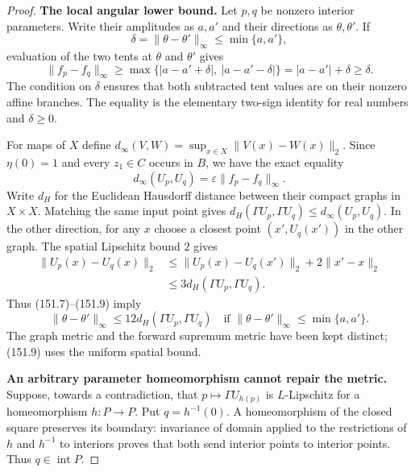 \begin{proof}
\textbf{The local angular lower bound.}
Let $p,q$ be nonzero interior parameters. Write their amplitudes as
$a,a'$ and their directions as $\theta,\theta'$. If
\[
             \delta=\|\theta-\theta'\|_\infty
                            \le\min\{a,a'\},
\]
evaluation of the two tents at $\theta$ and $\theta'$ gives
\[
 \|f_p-f_q\|_\infty
       \ge\max\{|a-a'+\delta|,\ |a-a'-\delta|\}
       =|a-a'|+\delta\ge\delta.
 \tag{151.7}
\]
The condition on $\delta$ ensures that both subtracted tent values
are on their nonzero affine branches. The equality is the elementary
two-sign identity for real numbers and $\delta\ge0$.

For maps of $X$ define
$d_\infty(V,W)=\sup_{x\in X}\|V(x)-W(x)\|_2$.
Since $\eta(0)=1$ and every $z_1\in C$ occurs in $B$, we have
the exact equality
\[
           d_\infty(U_p,U_q)
                     =\varepsilon\|f_p-f_q\|_\infty.
 \tag{151.8}
\]
Write $d_H$ for the Euclidean Hausdorff distance between their
compact graphs in $X\times X$. Matching the same input point gives
$d_H(\Gamma U_p,\Gamma U_q)\le d_\infty(U_p,U_q)$.
In the other direction, for any $x$ choose a closest point
$(x',U_q(x'))$ in the other graph. The spatial Lipschitz bound $2$
gives
\[
 \begin{split}
 \|U_p(x)-U_q(x)\|_2
 &\le\|U_p(x)-U_q(x')\|_2+
                         2\|x'-x\|_2\\
 &\le3d_H(\Gamma U_p,\Gamma U_q).
 \end{split}
 \tag{151.9}
\]
Thus (151.7)--(151.9) imply
\[
 \|\theta-\theta'\|_\infty
       \le12d_H(\Gamma U_p,\Gamma U_q)
 \quad\text{if }\|\theta-\theta'\|_\infty\le\min\{a,a'\}.
 \tag{151.10}
\]
The graph metric and the forward supremum metric have been kept
distinct; (151.9) uses the uniform spatial bound.

\textbf{An arbitrary parameter homeomorphism cannot repair the metric.}
Suppose, towards a contradiction, that
$p\mapsto\Gamma U_{h(p)}$ is $L$-Lipschitz for a homeomorphism
$h:P\to P$. Put $q=h^{-1}(0)$. A homeomorphism of the closed square
preserves its boundary: invariance of domain applied to the
restrictions of $h$ and $h^{-1}$ to interiors proves that both
send interior points to interior points. Thus $q\in\operatorname{int}P$.


\end{proof}
